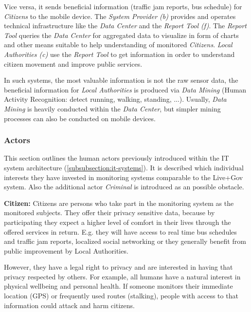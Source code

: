 Vice versa, it sends beneficial information (traffic jam reports, bus schedule) for \textit{Citizens} to the mobile device.
The \textit{System Provider (b)} provides and operates technical infrastructure like the \textit{Data Center} and the \textit{Report Tool (f)}.
The \textit{Report Tool} queries the \textit{Data Center} for aggregated data to visualize in form of charts and other means suitable to help understanding of monitored \textit{Citizens}. 
\textit{Local Authorities (c)} use the \textit{Report Tool} to get information in order to understand citizen movement and improve public services. 

In such systems, the most valuable information is not the raw sensor data, the beneficial information for \textit{Local Authorities} is produced via \textit{Data Mining} (Human Activity Recognition: detect running, walking, standing, ...). 
Usually, \textit{Data Mining} is heavily conducted within the \textit{Data Center}, but simpler mining processes can also be conducted on mobile devices.



\subsubsection{Actors}
\label{subsubsection:humans}

This section outlines the human actors previously introduced within the IT system architecture (\ref{subsubsection:it-systems}).
It is described which individual interests they have invested in monitoring systems comparable to the Live+Gov system. 
Also the additional actor \textit{Criminal} is introduced as an possible obstacle.

\textbf{Citizen:} 
Citizens are persons who take part in the monitoring system as the monitored subjects.
They offer their privacy sensitive data, because by participating they expect a higher level of comfort in their lives through the offered services in return.
E.g. they will have access to real time bus schedules and traffic jam reports, localized social networking or they generally benefit from public improvement by Local Authorities.

However, they have a legal right to privacy and are interested in having that privacy respected by others.
For example, all humans have a natural interest in physical wellbeing and personal health. 
If someone monitors their immediate location (GPS) or frequently used routes (stalking), people with access to that information could attack and harm citizens.

